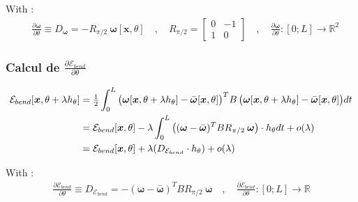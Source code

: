With :
\begin{align}
	&\frac{\partial \boldsymbol{\omega}}{\partial \theta} \equiv D_{\boldsymbol{\omega}} = - R_{\pi/2}\:\boldsymbol{\omega}[\boldsymbol{x}, \theta]
	\quad , \quad R_{\pi/2} = \left[\begin{array}{cc}0 & -1 \\1 & 0\end{array}\right]
	\quad , \quad \frac{\partial \boldsymbol{\omega}}{\partial \theta}  : [0;L] \longrightarrow \mathbb{R}^2
\end{align}


\subsubsection{Calcul de $\frac{\partial \mathcal{E}_{bend}}{\partial \theta}$}

\begin{align}
	\mathcal{E}_{bend}[\boldsymbol{x},\theta + \lambda h_{\theta}]
		& = \tfrac{1}{2} \int_{0}^{L} \big(\boldsymbol{\omega}[\boldsymbol{x}, \theta + \lambda h_{\theta}] - \bar{\boldsymbol{\omega}}[\boldsymbol{x}, \theta]\big)^T B \,  \big(\boldsymbol{\omega}[\boldsymbol{x}, \theta + \lambda h_{\theta}] - \bar{\boldsymbol{\omega}}[\boldsymbol{x}, \theta]\big)dt \notag\\
		& = \mathcal{E}_{bend}[\boldsymbol{x},\theta] - \lambda \int_{0}^{L} \big((\boldsymbol{\omega} - \bar{\boldsymbol{\omega}})^T B R_{\pi/2}\:\boldsymbol{\omega}\big)\cdot h_{\theta} dt + o(\lambda) \notag\\
		& =  \mathcal{E}_{bend}[\boldsymbol{x},\theta] + \lambda(D_{\mathcal{E}_{bend}} \cdot h_{\theta}) + o(\lambda)
\end{align}

With :
\begin{align}
	\frac{\partial \mathcal{E}_{bend}}{\partial \theta} \equiv D_{\mathcal{E}_{bend}} = -(\boldsymbol{\omega} - \bar{\boldsymbol{\omega}})^T B R_{\pi/2}\:\boldsymbol{\omega}
	\quad , \quad \frac{\partial \mathcal{E}_{bend}}{\partial \theta} : [0;L] \longrightarrow \mathbb{R}
\end{align}


